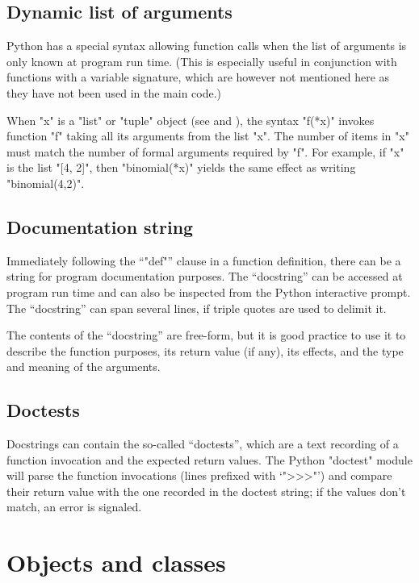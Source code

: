 {\subsection{Dynamic list of arguments}
\label{sec:fn-special-syntax}

Python has a special syntax allowing function calls when the list of
arguments is only known at program run time. (This is especially
useful in conjunction with functions with a variable signature, which
are however not mentioned here as they have not been used in the main
code.)

When "x" is a "list" or "tuple" object (see  and
), the syntax "f(*x)" invokes function "f"
taking all its arguments from the list "x".  The number of items in
"x" must match the number of formal arguments required by "f".  For
example, if "x" is the list "[4, 2]", then "binomial(*x)" yields the
same effect as writing "binomial(4,2)".

\subsection{Documentation string}
\label{sec:docstring}

Immediately following the ``"def"'' clause in a function definition,
there can be a string for program documentation purposes. The
``docstring'' can be accessed at program run time and can also be
inspected from the Python interactive prompt.  The ``docstring'' can
span several lines, if triple quotes are used to delimit it.

The contents of the ``docstring'' are free-form, but it is good
practice to use it to describe the function purposes, its return value
(if any), its effects, and the type and meaning of the arguments.

\subsection{Doctests}
\label{sec:doctests}

Docstrings can contain the so-called ``doctests'', which are a text
recording of a function invocation and the expected return values.
The Python "doctest" module will parse the function  invocations
(lines prefixed with `">>>"') and compare their return value with the
one recorded in the doctest string; if the values don't match, an
error is signaled. 

\section{Objects and classes}
\label{sec:objects}

}
